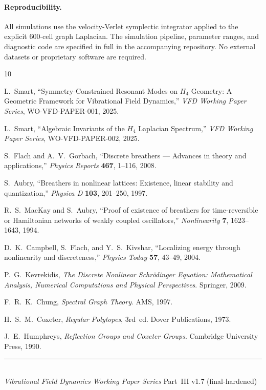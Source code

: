 \documentclass[12pt,a4paper]{article}
\begin{document}
\paragraph{Reproducibility.}
All simulations use the velocity-Verlet symplectic integrator applied
to the explicit 600-cell graph Laplacian.  The simulation pipeline,
parameter ranges, and diagnostic code are specified in full in the
accompanying repository.  No external datasets or proprietary
software are required.


\begin{thebibliography}{10}

L.~Smart,
``Symmetry-Constrained Resonant Modes on $H_4$ Geometry:
A Geometric Framework for Vibrational Field Dynamics,''
\textit{VFD Working Paper Series}, WO-VFD-PAPER-001, 2025.

L.~Smart,
``Algebraic Invariants of the $H_4$ Laplacian Spectrum,''
\textit{VFD Working Paper Series}, WO-VFD-PAPER-002, 2025.

S.~Flach and A.~V.~Gorbach,
``Discrete breathers --- Advances in theory and applications,''
\textit{Physics Reports} \textbf{467}, 1--116, 2008.

S.~Aubry,
``Breathers in nonlinear lattices: Existence, linear stability
and quantization,''
\textit{Physica D} \textbf{103}, 201--250, 1997.

R.~S.~MacKay and S.~Aubry,
``Proof of existence of breathers for time-reversible or
Hamiltonian networks of weakly coupled oscillators,''
\textit{Nonlinearity} \textbf{7}, 1623--1643, 1994.

D.~K.~Campbell, S.~Flach, and Y.~S.~Kivshar,
``Localizing energy through nonlinearity and discreteness,''
\textit{Physics Today} \textbf{57}, 43--49, 2004.

P.~G.~Kevrekidis,
\textit{The Discrete Nonlinear Schr\"odinger Equation:
Mathematical Analysis, Numerical Computations and Physical
Perspectives}.
Springer, 2009.

F.~R.~K.~Chung,
\textit{Spectral Graph Theory}.
AMS, 1997.

H.~S.~M.~Coxeter,
\textit{Regular Polytopes}, 3rd~ed.
Dover Publications, 1973.

J.~E.~Humphreys,
\textit{Reflection Groups and Coxeter Groups}.
Cambridge University Press, 1990.

\end{thebibliography}

\vfill
\noindent\rule{\textwidth}{0.4pt}\\[4pt]
{\footnotesize
\textit{Vibrational Field Dynamics Working Paper Series}
\hfill Part~III \quad v1.7 (final-hardened)}
\end{document}
